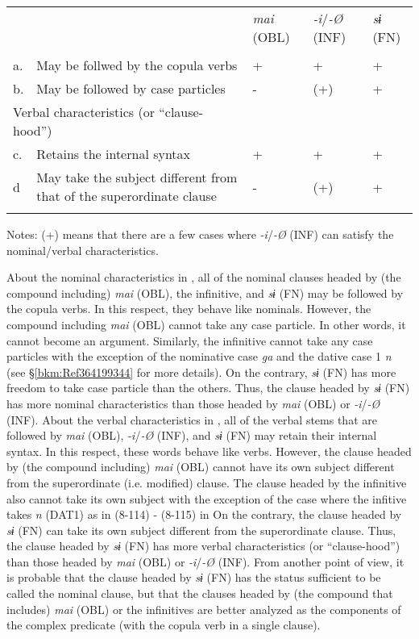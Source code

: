 \tabletail{}
\tablelasttail{}
\begin{tabularx}{\textwidth}{XXXXX} &  & { \textit{mai} (OBL)} & { \textit{{}-i}/\textit{{}-Ø} (INF)} & { \textit{sɨ} (FN)}\\
\lsptoprule
\multicolumn{2}{X}{{ Nominal characteristics}} &  &  & \\
{ a.} & { May be follwed by the copula verbs} & { +} & { +} & { +}\\
{ b.} & { May be followed by case particles} & { {}-} & { (+)} & { +}\\
\multicolumn{2}{X}{{ Verbal characteristics (or “clause-hood”)}} &  &  & \\
{ c.} & { Retains the internal syntax} & { +} & { +} & { +}\\
{ d} & { May take the subject different from that of the superordinate clause} & { {}-} & { (+)} & { +}\\
\lspbottomrule
\end{tabularx}
Notes: (+) means that there are a few cases where \textit{{}-i}/\textit{{}-Ø} (INF) can satisfy the nominal/verbal characteristics.

About the nominal characteristics in , all of the nominal clauses headed by (the compound including) \textit{mai} (OBL), the infinitive, and \textit{sɨ} (FN) may be followed by the copula verbs. In this respect, they behave like nominals. However, the compound including \textit{mai} (OBL) cannot take any case particle. In other words, it cannot become an argument. Similarly, the infinitive cannot take any case particles with the exception of the nominative case \textit{ga} and the dative case 1 \textit{n} (see §\ref{bkm:Ref364199344} for more details). On the contrary, \textit{sɨ} (FN) has more freedom to take case particle than the others. Thus, the clause headed by \textit{sɨ} (FN) has more nominal characteristics than those headed by \textit{mai} (OBL) or \textit{{}-i}/\textit{{}-Ø} (INF). About the verbal characteristics in , all of the verbal stems that are followed by \textit{mai} (OBL), \textit{{}-i}/\textit{{}-Ø} (INF), and \textit{sɨ} (FN) may retain their internal syntax. In this respect, these words behave like verbs. However, the clause headed by (the compound including) \textit{mai} (OBL) cannot have its own subject different from the superordinate (i.e. modified) clause. The clause headed by the infinitive also cannot take its own subject with the exception of the case where the infitive takes \textit{n} (DAT1) as in (8-114) - (8-115) in  On the contrary, the clause headed by \textit{sɨ} (FN) can take its own subject different from the superordinate clause. Thus, the clause headed by \textit{sɨ} (FN) has more verbal characteristics (or “clause-hood”) than those headed by \textit{mai} (OBL) or \textit{{}-i}/\textit{{}-Ø} (INF). From another point of view, it is probable that the clause headed by \textit{sɨ} (FN) has the status sufficient to be called the nominal clause, but that the clauses headed by (the compound that includes) \textit{mai} (OBL) or the infinitives are better analyzed as the components of the complex predicate (with the copula verb in a single clause).

